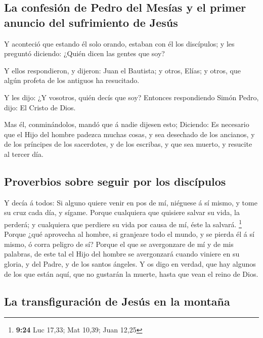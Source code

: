 \hypertarget{la-confesiuxf3n-de-pedro-del-mesuxedas-y-el-primer-anuncio-del-sufrimiento-de-jesuxfas}{%
\subsection{La confesión de Pedro del Mesías y el primer anuncio del
sufrimiento de
Jesús}\label{la-confesiuxf3n-de-pedro-del-mesuxedas-y-el-primer-anuncio-del-sufrimiento-de-jesuxfas}}

 Y aconteció que estando él solo orando, estaban con él
los discípulos; y les preguntó diciendo: ¿Quién dicen las gentes que
soy?

 Y ellos respondieron, y dijeron: Juan el Bautista; y
otros, Elías; y otros, que algún profeta de los antiguos ha resucitado.

 Y les dijo: ¿Y vosotros, quién decís que soy? Entonces
respondiendo Simón Pedro, dijo: El Cristo de Dios.

 Mas él, conminándolos, mandó que á nadie dijesen esto;
 Diciendo: Es necesario que el Hijo del hombre padezca
muchas cosas, y sea desechado de los ancianos, y de los príncipes de los
sacerdotes, y de los escribas, y que sea muerto, y resucite al tercer
día.

\hypertarget{proverbios-sobre-seguir-por-los-discuxedpulos}{%
\subsection{Proverbios sobre seguir por los
discípulos}\label{proverbios-sobre-seguir-por-los-discuxedpulos}}

 Y decía á todos: Si alguno quiere venir en pos de mí,
niéguese á sí mismo, y tome su cruz cada día, y sígame. 
Porque cualquiera que quisiere salvar su vida, la perderá; y cualquiera
que perdiere su vida por causa de mí, éste la salvará. \footnote{\textbf{9:24}
  Luc 17,33; Mat 10,39; Juan 12,25}  Porque ¿qué
aprovecha al hombre, si granjeare todo el mundo, y se pierda él á sí
mismo, ó corra peligro de sí?  Porque el que se
avergonzare de mí y de mis palabras, de este tal el Hijo del hombre se
avergonzará cuando viniere en su gloria, y del Padre, y de los santos
ángeles.  Y os digo en verdad, que hay algunos de los que
están aquí, que no gustarán la muerte, hasta que vean el reino de Dios.

\hypertarget{la-transfiguraciuxf3n-de-jesuxfas-en-la-montauxf1a}{%
\subsection{La transfiguración de Jesús en la
montaña}\label{la-transfiguraciuxf3n-de-jesuxfas-en-la-montauxf1a}}


